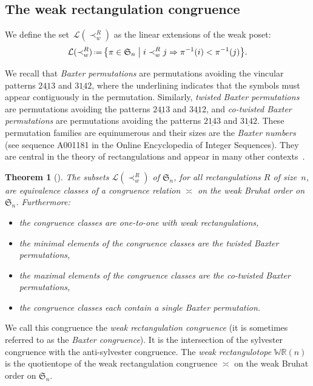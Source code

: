 \documentclass{amsart}
\newtheorem{theorem}{Theorem}%
\theoremstyle{definition}
\newcommand{\f}[1]{\mathfrak{#1}} %
\newcommand{\bigset}[2]{\big\{ #1 \;\big|\; #2 \big\}} %
\newcommand{\eqdef}{\mbox{\,\raisebox{0.2ex}{\scriptsize\ensuremath{\mathrm:}}\ensuremath{=}\,}} %
\renewcommand{\implies}{\Rightarrow} %
\newcommand{\darkblue}{\color{darkblue}} %
\newcommand{\defn}[1]{\textsl{\darkblue #1}} %
\newcommand{\polytope}[1]{\mathds{#1}} %
\newcommand{\WRP}{\polytope{WR}} %
\newcommand{\weakeq}{\asymp}
\begin{document}

\subsection{The weak rectangulation congruence}
\label{subsec:weakRectangulationCongruence}

We define the set~$\mathcal{L}(\prec_w^R)$ as the linear extensions of the weak poset:
\[
\mathcal{L}(\prec_w^R) \eqdef \bigset{\pi\in\f{S}_n }{ i\prec_w^R j\implies \pi^{-1}(i) < \pi^{-1}(j)}.
\]

We recall that \defn{Baxter permutations} are permutations avoiding the vincular patterns $2\underline{41}3$ and $3\underline{14}2$, where the underlining indicates that the symbols must appear contiguously in the permutation.
Similarly, \defn{twisted Baxter permutations} are permutations avoiding the patterns $2\underline{41}3$ and $3\underline{41}2$, and \defn{co-twisted Baxter permutations} are permutations avoiding the patterns $2\underline{14}3$ and $3\underline{14}2$.
These permutation families are equinumerous and their sizes are the \defn{Baxter numbers} (see sequence A001181 in the Online Encyclopedia of Integer Sequences).
They are central in the theory of rectangulations and appear in many other contexts~\cite{MR2763051}.

\pagebreak

\begin{theorem}[\cite{MR2871762}]
  \label{thm:weakCong}
  The subsets $\mathcal{L}(\prec_w^R)$ of $\f{S}_n$, for all rectangulations $R$ of size~$n$, 
  are equivalence classes of a congruence relation $\weakeq$ on the weak Bruhat order on $\f{S}_n$.
  Furthermore:
  \begin{itemize}
  \item the congruence classes are one-to-one with weak rectangulations,  
  \item the minimal elements of the congruence classes are the twisted Baxter permutations,
  \item the maximal elements of the congruence classes are the co-twisted Baxter permutations,
  \item the congruence classes each contain a single Baxter permutation. %
  \end{itemize}
\end{theorem}

We call this congruence the \defn{weak rectangulation congruence} (it is sometimes referred to as the \defn{Baxter congruence}).
It is the intersection of the sylvester congruence with the anti-sylvester congruence.
The \defn{weak rectangulotope} $\WRP(n)$ is the quotientope of the weak rectangulation congruence $\weakeq$ on the weak Bruhat order on $\f{S}_n$.
\end{document}
